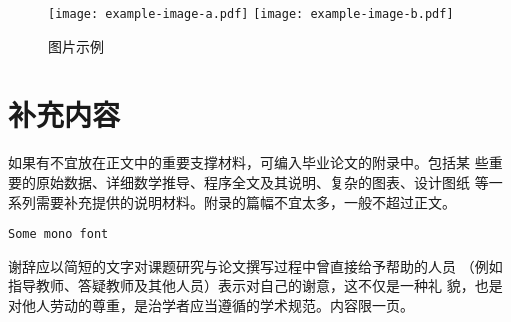 \documentclass{swufethesis}
\begin{document}
\begin{figure}[htb]
  \centering
  \texttt{[image: example-image-a.pdf]}
  \texttt{[image: example-image-b.pdf]}
  \caption{图片示例}
\end{figure}

\printbibliography

\appendix
\chapter{补充内容}
如果有不宜放在正文中的重要支撑材料，可编入毕业论文的附录中。包括某
些重要的原始数据、详细数学推导、程序全文及其说明、复杂的图表、设计图纸
等一系列需要补充提供的说明材料。附录的篇幅不宜太多，一般不超过正文。
\begin{verbatim}
Some mono font
\end{verbatim}

\backmatter
\begin{acknowledgments}
  谢辞应以简短的文字对课题研究与论文撰写过程中曾直接给予帮助的人员
  （例如指导教师、答疑教师及其他人员）表示对自己的谢意，这不仅是一种礼
  貌，也是对他人劳动的尊重，是治学者应当遵循的学术规范。内容限一页。
\end{acknowledgments}
\end{document}

